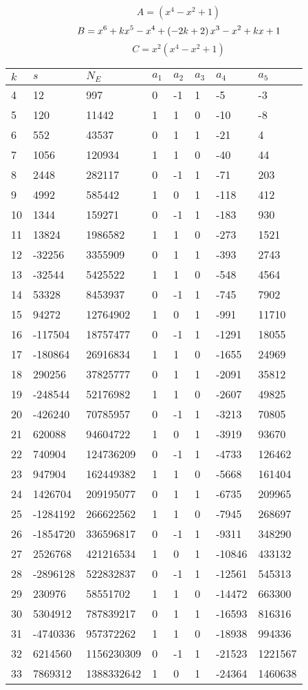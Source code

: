 \documentclass{amsart}
\begin{document}
$$A=(x^4
 - x^2
 + 1)$$
$$B=x^6
 + k\*x^5
 - x^4
 + \left(-2\*k
 + 2\right) \*x^3
 - x^2
 + k\*x
 + 1$$
$$C=x^2(x^4
 - x^2
 + 1)$$
\begin{longtable}{|l|l|l|lllll|}
\hline
$k$ & $s$ & $N_E$ & $a_1$ & $a_2$ & $a_3$ & $a_4$ & $a_5$\\
\hline
4&12&997&0&-1&1&-5&-3\\
5&120&11442&1&1&0&-10&-8\\
6&552&43537&0&1&1&-21&4\\
7&1056&120934&1&1&0&-40&44\\
8&2448&282117&0&-1&1&-71&203\\
9&4992&585442&1&0&1&-118&412\\
10&1344&159271&0&-1&1&-183&930\\
11&13824&1986582&1&1&0&-273&1521\\
12&-32256&3355909&0&1&1&-393&2743\\
13&-32544&5425522&1&1&0&-548&4564\\
14&53328&8453937&0&-1&1&-745&7902\\
15&94272&12764902&1&0&1&-991&11710\\
16&-117504&18757477&0&-1&1&-1291&18055\\
17&-180864&26916834&1&1&0&-1655&24969\\
18&290256&37825777&0&1&1&-2091&35812\\
19&-248544&52176982&1&1&0&-2607&49825\\
20&-426240&70785957&0&-1&1&-3213&70805\\
21&620088&94604722&1&0&1&-3919&93670\\
22&740904&124736209&0&-1&1&-4733&126462\\
23&947904&162449382&1&1&0&-5668&161404\\
24&1426704&209195077&0&1&1&-6735&209965\\
25&-1284192&266622562&1&1&0&-7945&268697\\
26&-1854720&336596817&0&-1&1&-9311&348290\\
27&2526768&421216534&1&0&1&-10846&433132\\
28&-2896128&522832837&0&-1&1&-12561&545313\\
29&230976&58551702&1&1&0&-14472&663300\\
30&5304912&787839217&0&1&1&-16593&816316\\
31&-4740336&957372262&1&1&0&-18938&994336\\
32&6214560&1156230309&0&-1&1&-21523&1221567\\
33&7869312&1388332642&1&0&1&-24364&1460638\\

\end{longtable}
\end{document}
